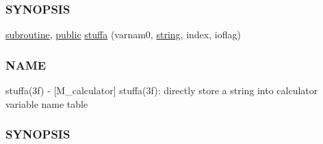 \begin{DoxyCompactItemize}
\begin{DoxyCompactList}
\subsubsection*{S\+Y\+N\+O\+P\+S\+IS}\end{DoxyCompactList}\item 
\hyperlink{M__stopwatch_83_8txt_acfbcff50169d691ff02d4a123ed70482}{subroutine}, \hyperlink{M__stopwatch_83_8txt_a2f74811300c361e53b430611a7d1769f}{public} \hyperlink{namespacem__calculator_ade5ed0d5db38a14b2c521bc268756f39}{stuffa} (varnam0, \hyperlink{what__overview_81_8txt_a74cb7e955273b9f9157b4f0c18a38849}{string}, index, ioflag)
\begin{DoxyCompactList}\small\item\em \subsubsection*{N\+A\+ME}

stuffa(3f) -\/ \mbox{[}M\+\_\+calculator\mbox{]} stuffa(3f)\+: directly store a string into calculator variable name table \subsubsection*{S\+Y\+N\+O\+P\+S\+IS}\end{DoxyCompactList}\end{DoxyCompactItemize}
